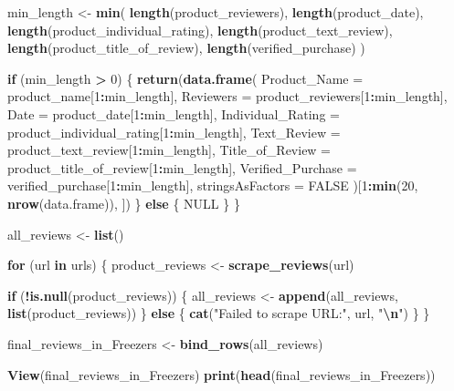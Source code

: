 \documentclass[
  11pt,
]{article}
\newenvironment{Shaded}{\begin{snugshade}}{\end{snugshade}}
\newcommand{\AttributeTok}[1]{\textcolor[rgb]{0.13,0.29,0.53}{#1}}
\newcommand{\ConstantTok}[1]{\textcolor[rgb]{0.56,0.35,0.01}{#1}}
\newcommand{\ControlFlowTok}[1]{\textcolor[rgb]{0.13,0.29,0.53}{\textbf{#1}}}
\newcommand{\DecValTok}[1]{\textcolor[rgb]{0.00,0.00,0.81}{#1}}
\newcommand{\FunctionTok}[1]{\textcolor[rgb]{0.13,0.29,0.53}{\textbf{#1}}}
\newcommand{\NormalTok}[1]{#1}
\newcommand{\OtherTok}[1]{\textcolor[rgb]{0.56,0.35,0.01}{#1}}
\newcommand{\SpecialCharTok}[1]{\textcolor[rgb]{0.81,0.36,0.00}{\textbf{#1}}}
\newcommand{\StringTok}[1]{\textcolor[rgb]{0.31,0.60,0.02}{#1}}
\begin{document}
\begin{Shaded}
\begin{Highlighting}[]
  
\NormalTok{  min\_length }\OtherTok{\textless{}{-}} \FunctionTok{min}\NormalTok{(}
    \FunctionTok{length}\NormalTok{(product\_reviewers),}
    \FunctionTok{length}\NormalTok{(product\_date),}
    \FunctionTok{length}\NormalTok{(product\_individual\_rating),}
    \FunctionTok{length}\NormalTok{(product\_text\_review),}
    \FunctionTok{length}\NormalTok{(product\_title\_of\_review),}
    \FunctionTok{length}\NormalTok{(verified\_purchase)}
\NormalTok{  )}
  
  
  \ControlFlowTok{if}\NormalTok{ (min\_length }\SpecialCharTok{\textgreater{}} \DecValTok{0}\NormalTok{) \{}
    \FunctionTok{return}\NormalTok{(}\FunctionTok{data.frame}\NormalTok{(}
      \AttributeTok{Product\_Name =}\NormalTok{ product\_name[}\DecValTok{1}\SpecialCharTok{:}\NormalTok{min\_length],}
      \AttributeTok{Reviewers =}\NormalTok{ product\_reviewers[}\DecValTok{1}\SpecialCharTok{:}\NormalTok{min\_length],}
      \AttributeTok{Date =}\NormalTok{ product\_date[}\DecValTok{1}\SpecialCharTok{:}\NormalTok{min\_length],}
      \AttributeTok{Individual\_Rating =}\NormalTok{ product\_individual\_rating[}\DecValTok{1}\SpecialCharTok{:}\NormalTok{min\_length],}
      \AttributeTok{Text\_Review =}\NormalTok{ product\_text\_review[}\DecValTok{1}\SpecialCharTok{:}\NormalTok{min\_length],}
      \AttributeTok{Title\_of\_Review =}\NormalTok{ product\_title\_of\_review[}\DecValTok{1}\SpecialCharTok{:}\NormalTok{min\_length],}
      \AttributeTok{Verified\_Purchase =}\NormalTok{ verified\_purchase[}\DecValTok{1}\SpecialCharTok{:}\NormalTok{min\_length],}
      \AttributeTok{stringsAsFactors =} \ConstantTok{FALSE}
\NormalTok{    )[}\DecValTok{1}\SpecialCharTok{:}\FunctionTok{min}\NormalTok{(}\DecValTok{20}\NormalTok{, }\FunctionTok{nrow}\NormalTok{(data.frame)), ])}
\NormalTok{  \} }\ControlFlowTok{else}\NormalTok{ \{}
    \ConstantTok{NULL}
\NormalTok{  \}}
\NormalTok{\}}


\NormalTok{all\_reviews }\OtherTok{\textless{}{-}} \FunctionTok{list}\NormalTok{()}


\ControlFlowTok{for}\NormalTok{ (url }\ControlFlowTok{in}\NormalTok{ urls) \{}
\NormalTok{  product\_reviews }\OtherTok{\textless{}{-}} \FunctionTok{scrape\_reviews}\NormalTok{(url)}
  
  \ControlFlowTok{if}\NormalTok{ (}\SpecialCharTok{!}\FunctionTok{is.null}\NormalTok{(product\_reviews)) \{}
\NormalTok{    all\_reviews }\OtherTok{\textless{}{-}} \FunctionTok{append}\NormalTok{(all\_reviews, }\FunctionTok{list}\NormalTok{(product\_reviews))}
\NormalTok{  \} }\ControlFlowTok{else}\NormalTok{ \{}
    \FunctionTok{cat}\NormalTok{(}\StringTok{"Failed to scrape URL:"}\NormalTok{, url, }\StringTok{"}\SpecialCharTok{\textbackslash{}n}\StringTok{"}\NormalTok{)}
\NormalTok{  \}}
\NormalTok{\}}


\NormalTok{final\_reviews\_in\_Freezers }\OtherTok{\textless{}{-}} \FunctionTok{bind\_rows}\NormalTok{(all\_reviews)}


\FunctionTok{View}\NormalTok{(final\_reviews\_in\_Freezers)}
\FunctionTok{print}\NormalTok{(}\FunctionTok{head}\NormalTok{(final\_reviews\_in\_Freezers))}
\end{Highlighting}
\end{Shaded}
\end{document}
